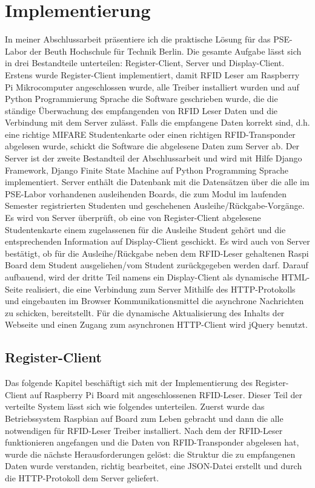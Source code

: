 \chapter{Implementierung}
\label{sec:imp}
In meiner Abschlussarbeit präsentiere ich die praktische Lösung für das PSE-Labor der Beuth Hochschule für Technik Berlin. Die gesamte Aufgabe lässt sich in drei Bestandteile unterteilen: Register-Client, Server und Display-Client. Erstens wurde Register-Client implementiert, damit RFID Leser am Raspberry Pi Mikrocomputer angeschlossen wurde, alle Treiber installiert wurden und auf Python Programmierung Sprache die Software geschrieben wurde, die die ständige Überwachung des empfangenden von RFID Leser Daten und die Verbindung mit dem Server zulässt. Falls die empfangene Daten korrekt sind, d.h.  eine richtige MIFARE Studentenkarte oder einen richtigen RFID-Transponder abgelesen wurde, schickt die Software die abgelesene Daten zum Server ab. Der Server ist der zweite Bestandteil der Abschlussarbeit und wird mit Hilfe Django Framework, Django Finite State Machine auf Python Programming Sprache implementiert. Server enthält die Datenbank mit die Datensätzen über die alle im PSE-Labor vorhandenen ausleihenden Boards, die zum Modul im laufenden Semester registrierten Studenten und  geschehenen Ausleihe/Rückgabe-Vorgänge. Es wird von Server überprüft, ob eine von Register-Client abgelesene Studentenkarte einem zugelassenen für die Ausleihe Student gehört und die entsprechenden Information auf Display-Client geschickt. Es wird auch von Server bestätigt, ob für die Ausleihe/Rückgabe neben dem RFID-Leser gehaltenen Raspi Board dem Student ausgeliehen/vom Student zurückgegeben werden darf. Darauf aufbauend, wird der dritte Teil namens ein Display-Client als dynamische HTML-Seite realisiert, die eine Verbindung zum Server Mithilfe des HTTP-Protokolls und eingebauten im Browser Kommunikationsmittel die asynchrone Nachrichten zu schicken, bereitstellt. Für die dynamische Aktualisierung des Inhalts der Webseite und einen Zugang zum asynchronen HTTP-Client wird jQuery benutzt.
\section{Register-Client}
\label{sec:register_client}
Das folgende Kapitel beschäftigt sich mit der Implementierung des Register-Client auf Raspberry Pi Board mit angeschlossenen RFID-Leser. Dieser Teil der verteilte System lässt sich wie folgendes unterteilen. Zuerst wurde das Betriebssystem Raspbian auf Board zum Leben gebracht und dann die alle notwendigen für RFID-Leser Treiber installiert. Nach dem der RFID-Leser funktionieren angefangen und die Daten von RFID-Transponder abgelesen hat, wurde die nächste Herausforderungen gelöst: die Struktur die zu empfangenen Daten wurde verstanden, richtig bearbeitet, eine JSON-Datei erstellt und durch die HTTP-Protokoll dem Server geliefert. 

